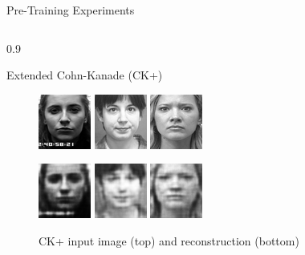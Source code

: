 \documentclass[final]{beamer}
\newlength{\onecolwid}
\newlength{\threecolwid}
\begin{document}
\begin{frame}[t]
\begin{columns}[t]
\begin{column}{\threecolwid}
\begin{alertblock}{Pre-Training Experiments}
\begin{columns}[t, totalwidth=0.9\threecolwid]
\begin{column}{0.9\onecolwid}
\begin{block}{Extended Cohn-Kanade (CK+)}
\begin{figure}
\centering
\includegraphics[width=0.2\linewidth]{graphics/reconstructions/ckplus/input_00.png}
\includegraphics[width=0.2\linewidth]{graphics/reconstructions/ckplus/input_01.png}
\includegraphics[width=0.2\linewidth]{graphics/reconstructions/ckplus/input_02.png}

\includegraphics[width=0.2\linewidth]{graphics/reconstructions/ckplus/reconstruction_00.png}
\includegraphics[width=0.2\linewidth]{graphics/reconstructions/ckplus/reconstruction_01.png}
\includegraphics[width=0.2\linewidth]{graphics/reconstructions/ckplus/reconstruction_02.png}

\caption{CK+ input image (top) and reconstruction (bottom)}
\end{figure}


\end{block}
\end{column}
\end{columns}
\end{alertblock}
\end{column}
\end{columns}
\end{frame}
\end{document}
